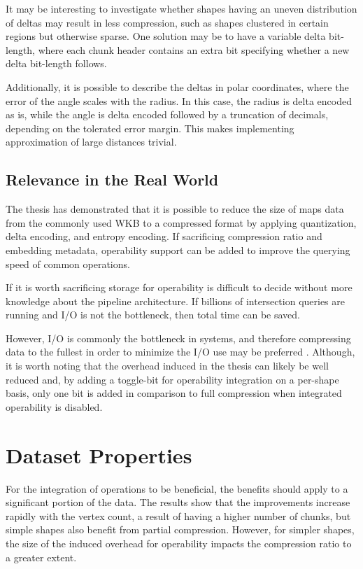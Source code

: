 It may be interesting to investigate whether shapes having an uneven distribution of deltas may result in less compression, such as shapes clustered in certain regions but otherwise sparse. One solution may be to have a variable delta bit-length, where each chunk header contains an extra bit specifying whether a new delta bit-length follows.

Additionally, it is possible to describe the deltas in polar coordinates, where the error of the angle scales with the radius. In this case, the radius is delta encoded as is, while the angle is delta encoded followed by a truncation of decimals, depending on the tolerated error margin. This makes implementing approximation of large distances trivial.







\subsection{Relevance in the Real World}
The thesis has demonstrated that it is possible to reduce the size of maps data from the commonly used WKB to a compressed format by applying quantization, delta encoding, and entropy encoding. If sacrificing compression ratio and embedding metadata, operability support can be added to improve the querying speed of common operations. 

If it is worth sacrificing storage for operability is difficult to decide without more knowledge about the pipeline architecture. If billions of intersection queries are running and I/O is not the bottleneck, then total time can be saved.

However, I/O is commonly the bottleneck in systems, and therefore compressing data to the fullest in order to minimize the I/O use may be preferred \cite{fpzip}. Although, it is worth noting that the overhead induced in the thesis can likely be well reduced and, by adding a toggle-bit for operability integration on a per-shape basis, only one bit is added in comparison to full compression when integrated operability is disabled.


\section{Dataset Properties}
For the integration of operations to be beneficial, the benefits should apply to a significant portion of the data. The results show that the improvements increase rapidly with the vertex count, a result of having a higher number of chunks, but simple shapes also benefit from partial compression. However, for simpler shapes, the size of the induced overhead for operability impacts the compression ratio to a greater extent. 


